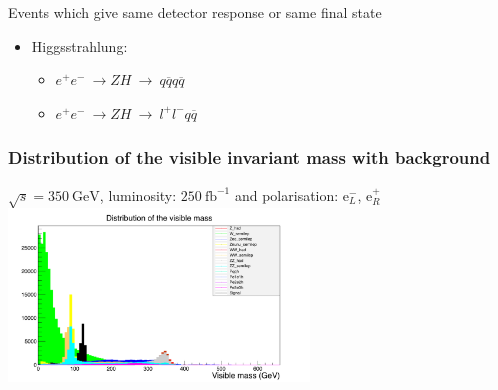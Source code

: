 \documentclass{beamer}
\begin{document}
\begin{frame}
{{\begin{block}{Events which give same detector response or same final state}
\begin{itemize}
\begin{itemize}
            \item $e^+e^- \ \rightarrow \ Z \ q\overline{q} \ \rightarrow q\overline{q}q\overline{q}$
          \end{itemize}
          \vspace{-0.2cm}
        \item Higgsstrahlung:
          \vspace{-0.1cm}
          \begin{itemize}
            \item $e^+e^- \ \rightarrow ZH \ \rightarrow \ q\overline{q}q\overline{q}$ 
            \item $e^+e^- \ \rightarrow ZH \ \rightarrow \ l^+ l^- q \overline{q}$
          \end{itemize}
      \end{itemize}
    \end{block}
  }}
\end{frame}

\begin{frame}
  \frametitle{Distribution of the visible invariant mass with background}
  \begin{center}
    $\sqrt{s} = 350~\text{GeV}$, luminosity: $250~\text{fb}^{-1}$ and polarisation: e$^-_L$, e$^+_R$
    \includegraphics[width = 8cm]{Pictures/mVis_all.png}
  \end{center}
\end{frame}
\end{document}
